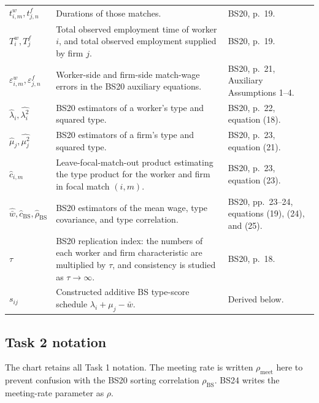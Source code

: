\documentclass[11pt]{article}
\begin{document}
\begin{longtable}{p{}p{}p{}}
\(t^w_{i,m},t^f_{j,n}\) & Durations of those matches. & BS20, p.\ 19. \\
\(T_i^w,T_j^f\) & Total observed employment time of worker \(i\), and total
observed employment supplied by firm \(j\). & BS20, p.\ 19. \\
\(\varepsilon^w_{i,m},\varepsilon^f_{j,n}\) & Worker-side and firm-side
match-wage errors in the BS20 auxiliary equations. & BS20, p.\ 21,
Auxiliary Assumptions 1--4. \\
\(\widehat\lambda_i,\widehat{\lambda_i^2}\) & BS20 estimators of a worker's
type and squared type. & BS20, p.\ 22, equation (18). \\
\(\widehat\mu_j,\widehat{\mu_j^2}\) & BS20 estimators of a firm's type and
squared type. & BS20, p.\ 23, equation (21). \\
\(\widehat c_{i,m}\) & Leave-focal-match-out product estimating the type
product for the worker and firm in focal match \((i,m)\). & BS20, p.\ 23,
equation (23). \\
\(\widehat{\bar w},\widehat c_{\mathrm{BS}},\widehat\rho_{\mathrm{BS}}\) &
BS20 estimators of the mean wage, type covariance, and type correlation. &
BS20, pp.\ 23--24, equations (19), (24), and (25). \\
\(\tau\) & BS20 replication index: the numbers of each worker and firm
characteristic are multiplied by \(\tau\), and consistency is studied as
\(\tau\to\infty\). & BS20, p.\ 18. \\
\(s_{ij}\) & Constructed additive BS type-score schedule
\(\lambda_i+\mu_j-\bar w\). & Derived below. \\
\end{longtable}
\subsection{Task 2 notation}

The chart retains all Task 1 notation.  The meeting rate is written
\(\rho_{\mathrm{meet}}\) here to prevent confusion with the BS20 sorting
correlation \(\rho_{\mathrm{BS}}\).  BS24 writes the meeting-rate parameter as
\(\rho\).
\end{document}
